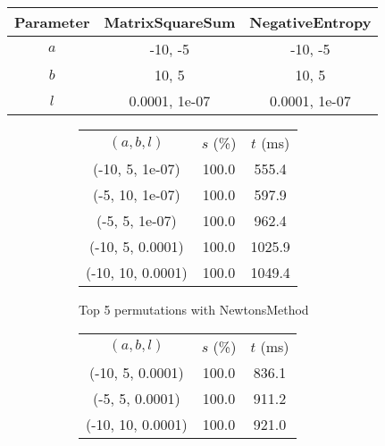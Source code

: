 \begin{center}
\label{tab:params_BisectionSearch}
\begin{tabular}{|c|c|c|}
\hline
\rowcolor{gray!25}
Parameter & MatrixSquareSum & NegativeEntropy \\
\hline
$a$ & -10, -5 & -10, -5 \\
$b$ & 10, 5 & 10, 5 \\
$l$ & 0.0001, 1e-07 & 0.0001, 1e-07 \\
\hline
\end{tabular}
\end{center}

\begin{figure}[H]
\label{fig:param_comp_MatrixSquareSum_BisectionSearch}
\begin{subfigure}[ht]{.5\textwidth}
\begin{tabular}{|c|c|c|}
\hline
\rowcolor{gray!25}
\multicolumn{3}{|c|}{NewtonsMethod} \\
\hline
\rowcolor{gray!25}
$(a,b,l)$ & $s$ (\%) & $t$ (ms) \\
\hline
(-10, 5, 1e-07) & 100.0 & 555.4 \\
(-5, 10, 1e-07) & 100.0 & 597.9 \\
(-5, 5, 1e-07) & 100.0 & 962.4 \\
(-10, 5, 0.0001) & 100.0 & 1025.9 \\
(-10, 10, 0.0001) & 100.0 & 1049.4 \\
\hline
\end{tabular}
\caption{Top 5 permutations with NewtonsMethod}
\label{subfig:param_comp_MatrixSquareSum_NewtonsMethod_BisectionSearch}
\end{subfigure}
\hfill
\begin{subfigure}[ht]{.5\textwidth}
\begin{tabular}{|c|c|c|}
\hline
\rowcolor{gray!25}
\multicolumn{3}{|c|}{GradientDescentMethod} \\
\hline
\rowcolor{gray!25}
$(a,b,l)$ & $s$ (\%) & $t$ (ms) \\
\hline
(-10, 5, 0.0001) & 100.0 & 836.1 \\
(-5, 5, 0.0001) & 100.0 & 911.2 \\
(-10, 10, 0.0001) & 100.0 & 921.0 \\

\end{tabular}
\end{subfigure}
\end{figure}
